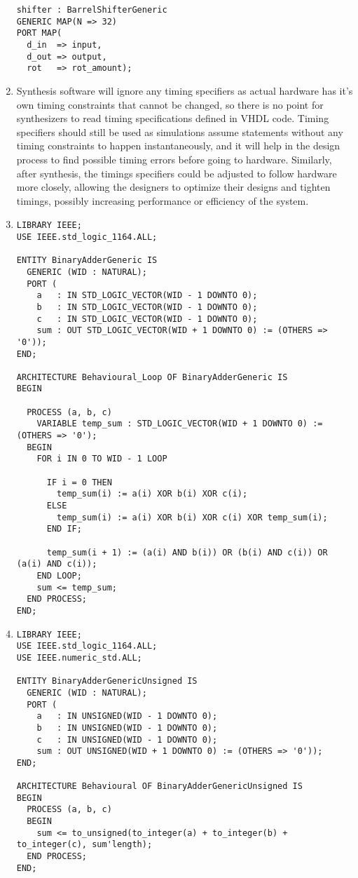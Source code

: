 \documentclass{article}
\begin{document}
\begin{enumerate}
        \begin{verbatim}
shifter : BarrelShifterGeneric
GENERIC MAP(N => 32)
PORT MAP(
  d_in  => input,
  d_out => output,
  rot   => rot_amount);
            \end{verbatim}

  \item Synthesis software will ignore any timing specifiers as actual hardware has it's own timing constraints that cannot be changed, so there is no point for synthesizers to read timing specifications defined in VHDL code.
        Timing specifiers should still be used as simulations assume statements without any timing constraints to happen instantaneously, and it will help in the design process to find possible timing errors before going to hardware.
        Similarly, after synthesis, the timings specifiers could be adjusted to follow hardware more closely, allowing the designers to optimize their designs and tighten timings, possibly increasing performance or efficiency of the system.

  \item \begin{verbatim}
LIBRARY IEEE;
USE IEEE.std_logic_1164.ALL;

ENTITY BinaryAdderGeneric IS
  GENERIC (WID : NATURAL);
  PORT (
    a   : IN STD_LOGIC_VECTOR(WID - 1 DOWNTO 0);
    b   : IN STD_LOGIC_VECTOR(WID - 1 DOWNTO 0);
    c   : IN STD_LOGIC_VECTOR(WID - 1 DOWNTO 0);
    sum : OUT STD_LOGIC_VECTOR(WID + 1 DOWNTO 0) := (OTHERS => '0'));
END;

ARCHITECTURE Behavioural_Loop OF BinaryAdderGeneric IS
BEGIN

  PROCESS (a, b, c)
    VARIABLE temp_sum : STD_LOGIC_VECTOR(WID + 1 DOWNTO 0) := (OTHERS => '0');
  BEGIN
    FOR i IN 0 TO WID - 1 LOOP

      IF i = 0 THEN
        temp_sum(i) := a(i) XOR b(i) XOR c(i);
      ELSE
        temp_sum(i) := a(i) XOR b(i) XOR c(i) XOR temp_sum(i);
      END IF;

      temp_sum(i + 1) := (a(i) AND b(i)) OR (b(i) AND c(i)) OR (a(i) AND c(i));
    END LOOP;
    sum <= temp_sum;
  END PROCESS;
END;
  \end{verbatim}

  \item  \begin{verbatim}
LIBRARY IEEE;
USE IEEE.std_logic_1164.ALL;
USE IEEE.numeric_std.ALL;

ENTITY BinaryAdderGenericUnsigned IS
  GENERIC (WID : NATURAL);
  PORT (
    a   : IN UNSIGNED(WID - 1 DOWNTO 0);
    b   : IN UNSIGNED(WID - 1 DOWNTO 0);
    c   : IN UNSIGNED(WID - 1 DOWNTO 0);
    sum : OUT UNSIGNED(WID + 1 DOWNTO 0) := (OTHERS => '0'));
END;

ARCHITECTURE Behavioural OF BinaryAdderGenericUnsigned IS
BEGIN
  PROCESS (a, b, c)
  BEGIN
    sum <= to_unsigned(to_integer(a) + to_integer(b) + to_integer(c), sum'length);
  END PROCESS;
END;
  \end{verbatim}

\end{enumerate}
\end{document}
